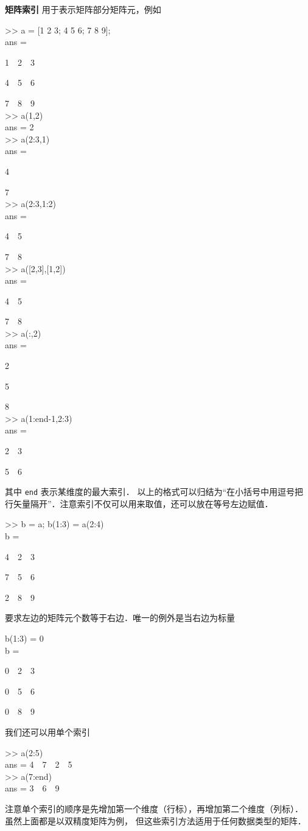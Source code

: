 \textbf{矩阵索引} 用于表示矩阵部分矩阵元，例如
\begin{Command}
>> a = [1 2 3; 4 5 6; 7 8 9]; \\
ans = \par
1\ \ 2\ \ 3 \par
4\ \ 5\ \ 6 \par
7\ \ 8\ \ 9 \\
>> a(1,2) \\
ans = 2 \\
>> a(2:3,1) \\
ans = \par
4 \par
7 \\
>> a(2:3,1:2) \\
ans = \par
4\ \ 5 \par
7\ \ 8 \\
>> a([2,3],[1,2]) \\
ans = \par
4\ \ 5 \par
7\ \ 8 \\
>> a(:,2) \\
ans = \par
2 \par
5 \par
8 \\
>> a(1:end-1,2:3) \\
ans = \par
2\ \ 3 \par
5\ \ 6
\end{Command}
其中 \texttt{end} 表示某维度的最大索引． 以上的格式可以归结为“在小括号中用逗号把行矢量隔开”．注意索引不仅可以用来取值，还可以放在等号左边赋值．
\begin{Command}
>> b = a; b(1:3) = a(2:4) \\
b = \par
4\ \ 2\ \ 3 \par
7\ \ 5\ \ 6 \par
2\ \ 8\ \ 9
\end{Command}
要求左边的矩阵元个数等于右边．唯一的例外是当右边为标量
\begin{Command}
b(1:3) = 0 \\
b = \par
0\ \ 2\ \ 3 \par
0\ \ 5\ \ 6 \par
0\ \ 8\ \ 9 
\end{Command}
我们还可以用单个索引
\begin{Command}
>> a(2:5)\\
ans = 4\ \ 7\ \ 2\ \ 5 \\
>> a(7:end)\\
ans = 3\ \ 6\ \ 9
\end{Command}
注意单个索引的顺序是先增加第一个维度（行标），再增加第二个维度（列标）． 虽然上面都是以双精度矩阵为例， 但这些索引方法适用于任何数据类型的矩阵．

